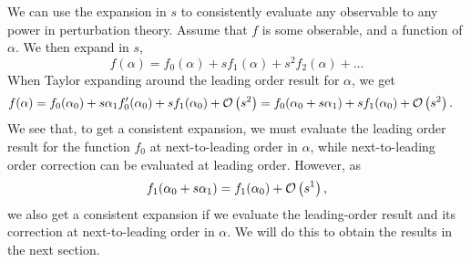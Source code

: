 We can use the expansion in $s$ to consistently evaluate any observable to any power in perturbation theory.
Assume that $f$ is some obserable, and a function of $\alpha$.
We then expand in $s$,
\begin{equation}
    f(\alpha) = f_0(\alpha) + s f_1(\alpha) + s^2 f_2(\alpha) + \dots
\end{equation}
%
When Taylor expanding around the leading order result for $\alpha$, we get
\begin{align*}
    f(\alpha) 
    & 
    = 
    f_0(\alpha_0)
    +
    s\alpha_1  f_0'(\alpha_0)
    +
    s f_1(\alpha_0)
    + \Oh[2]{s}
    = f_0(\alpha_0 + s \alpha_1)
    + s f_1(\alpha_0)
    + \Oh[2]{s}.
\end{align*}
We see that, to get a consistent expansion, we must evaluate the leading order result for the function $f_0$ at next-to-leading order in $\alpha$, while next-to-leading order correction can be evaluated at leading order.
However, as
\begin{equation}
    f_1(\alpha_0 + s\alpha_1) = f_1(\alpha_0) + \Oh[1]{s},
\end{equation}
%
we also get a consistent expansion if we evaluate the leading-order result and its correction at next-to-leading order in $\alpha$.
We will do this to obtain the results in the next section.
